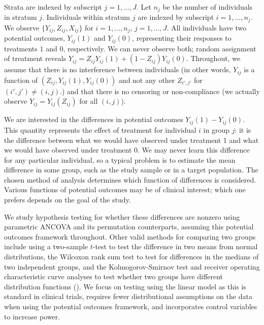 \documentclass[12pt]{article}
\newcommand{\todo}[1]{{\color{red}{TO DO: \sc #1}}}
\begin{document}
Strata are indexed by subscript $j = 1, \dots, J$.
Let $n_j$ be the number of individuals in stratum $j$.
Individuals within stratum $j$ are indexed by subscript $i = 1, \dots, n_j$.
We observe $\{Y_{ij}, Z_{ij}, X_{ij}\}$ for $i = 1, \dots, n_j$, $j = 1, \dots, J$.
All individuals have two potential outcomes, $Y_{ij}(1)$ and $Y_{ij}(0)$, representing their responses to treatments $1$ and $0$, respectively.
We can never observe both; random assignment of treatment reveals $Y_{ij} = Z_{ij}Y_{ij}(1) + (1-Z_{ij})Y_{ij}(0)$.
Throughout, we assume that there is no interference between individuals 
(in other words, $Y_{ij}$ is a function of $(Z_{ij}, Y_{ij}(1), Y_{ij}(0))$ and not any other $Z_{i', j'}$ for $(i', j') \neq (i, j)$.)
and that there is no censoring or non-compliance
(we actually observe $Y_{ij} = Y_{ij}(Z_{ij})$ for all $(i, j)$).

We are interested in the differences in potential outcomes $Y_{ij}(1) - Y_{ij}(0)$.
This quantity represents the effect of treatment for individual $i$ in group $j$: 
it is the difference between what we would have observed under treatment 1 and what we would have observed under treatment $0$.
We may never learn this difference for any particular individual, so
a typical problem is to estimate the mean difference in some group, such as the study sample or in a target population.
The chosen method of analysis determines which function of differences is considered.
Various functions of potential outcomes may be of clinical interest; which one prefers depends on the goal of the study.

We study hypothesis testing for whether these differences are nonzero using parametric ANCOVA and its permutation counterparts, assuming this potential outcomes framework throughout.
\todo{make sure the parametric section actually reflects the potential outcomes framework. See Jas's email and the Winston Lim paper}
Other valid methods for comparing two groups include using a two-sample $t$-test to test the difference in two means from normal distributions,
the Wilcoxon rank sum test to test for differences in the medians of two independent groups, 
and the Kolmogorov-Smirnov test and receiver operating characteristic curve analyses to test whether two groups have different distribution functions (\cite{lehmann_nonparametrics_1975,  vexler_statistical_2016}).
We focus on testing using the linear model as this is standard in clinical trials, requires fewer distributional assumptions on the data when using the potential outcomes framework, and incorporates control variables to increase power.
\end{document}
